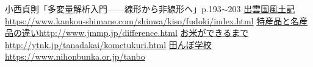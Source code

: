 \documentclass{jarticle}
\begin{document}
\begin{thebibliography}{9}
   小西貞則「多変量解析入門——線形から非線形へ」p.193$\sim$203
  \href{  https://www.kankou-shimane.com/shinwa/kiso/fudoki/index.html}{出雲国風土記}\url{  https://www.kankou-shimane.com/shinwa/kiso/fudoki/index.html}
 \href{ http://www.jmmp.jp/difference.html }{特産品と名産品の違い}\url{http://www.jmmp.jp/difference.html}
 \href{ http://ytnk.jp/tanadakai/kometukuri.html}{お米ができるまで}\url{http://ytnk.jp/tanadakai/kometukuri.html}
 \href{https://www.nihonbunka.or.jp/tanbo }{田んぼ学校}\url{https://www.nihonbunka.or.jp/tanbo}

\end{thebibliography}
\end{document}
